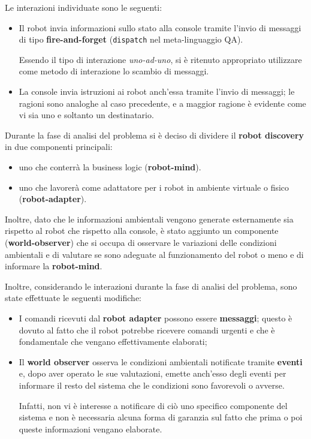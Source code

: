 \documentclass{llncs}
\begin{document}
Le interazioni individuate sono le seguenti:

\begin{itemize}
  \item
    Il robot invia informazioni sullo stato alla console tramite l'invio di messaggi di tipo \textbf{fire-and-forget}
    (\texttt{dispatch} nel meta-linguaggio QA).

    Essendo il tipo di interazione \textit{uno-ad-uno}, si è ritenuto appropriato utilizzare come metodo di interazione lo scambio di messaggi.

  \item
    La console invia istruzioni ai robot anch'essa tramite l'invio di messaggi;
    le ragioni sono analoghe al caso precedente, e a maggior ragione è evidente come vi sia uno e soltanto un destinatario.
\end{itemize}

Durante la fase di analisi del problema si è deciso di dividere il \textbf{robot discovery} in due componenti principali:

\begin{itemize}
  \item uno che conterrà la business logic (\textbf{robot-mind}).
  \item uno che lavorerà come adattatore per i robot in ambiente virtuale o fisico (\textbf{robot-adapter}).
\end{itemize}

Inoltre, dato che le informazioni ambientali vengono generate esternamente sia rispetto al robot che rispetto alla console,
è stato aggiunto un componente (\textbf{world-observer}) che si occupa di osservare le variazioni delle condizioni ambientali e di valutare se sono adeguate al funzionamento del robot o meno e di informare la \textbf{robot-mind}.

Inoltre, considerando le interazioni durante la fase di analisi del problema, sono state effettuate le seguenti modifiche:

\begin{itemize}
    \item
      I comandi ricevuti dal \textbf{robot adapter} possono essere \textbf{messaggi};
      questo è dovuto al fatto che il robot potrebbe ricevere comandi urgenti e che è fondamentale che vengano effettivamente elaborati;
    \item
      Il \textbf{world observer} osserva le condizioni ambientali notificate tramite \textbf{eventi} e, dopo aver operato le sue valutazioni, emette anch'esso degli eventi per informare il resto del sistema che le condizioni sono favorevoli o avverse.

      Infatti, non vi è interesse a notificare di ciò uno specifico componente del sistema e non è necessaria alcuna forma di garanzia sul fatto che prima o poi queste informazioni vengano elaborate.
\end{itemize}
\end{document}
